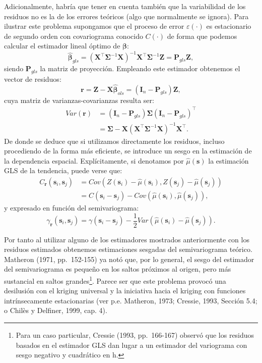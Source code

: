 \documentclass[
  spanish,
]{book}
\theoremstyle{break}
\theoremstyle{definition}
\theoremstyle{definition}
\theoremstyle{definition}
\theoremstyle{definition}
\theoremstyle{remark}
\begin{document}
Adicionalmente, habría que tener en cuenta también que la variabilidad de los residuos no es la de los errores teóricos (algo que normalmente se ignora).
Para ilustrar este problema supongamos que el proceso de error \(\varepsilon(\cdot)\) es estacionario de segundo orden con covariograma conocido \(C(\cdot)\) de forma que podemos calcular el estimador lineal óptimo de \(\boldsymbol{\beta}\):
\[\hat{\boldsymbol{\beta}}_{gls} =(\mathbf{X}^{\top}\boldsymbol{\Sigma}^{-1} \mathbf{X})^{-1} \mathbf{X}^{\top}\boldsymbol{\Sigma}^{-1} \mathbf{Z} = \mathbf{P}_{gls}\mathbf{Z},\]
siendo \(\mathbf{P}_{gls}\) la matriz de proyección.
Empleando este estimador obtenemos el vector de residuos:
\[\mathbf{r} =\mathbf{Z}-\mathbf{X}\hat{\boldsymbol{\beta}}_{ols} =\left( \mathbf{I}_{n} - \mathbf{P}_{gls} \right)\mathbf{Z},\]
cuya matriz de varianzas-covarianzas resulta ser:
\[\begin{aligned}
Var(\mathbf{r}) &=(\mathbf{I}_{n} -\mathbf{P}_{gls})\boldsymbol{\Sigma}(\mathbf{I}_{n}
-\mathbf{P}_{gls})^\top  \\
& = \boldsymbol{\Sigma} - \mathbf{X}(\mathbf{X}^\top\boldsymbol{\Sigma}^{-1} \mathbf{X})^{-1}
\mathbf{X}^\top.
\end{aligned}\]
De donde se deduce que si utilizamos directamente los residuos, incluso procediendo de la forma más eficiente, se introduce un sesgo en la estimación de la dependencia espacial.
Explícitamente, si denotamos por \(\hat{\mu}(\mathbf{s})\) la estimación GLS de la tendencia, puede verse que:
\[\begin{aligned}
C_{\mathbf{r}}(\mathbf{s}_{i} ,\mathbf{s}_{j}) &= Cov\left(Z(\mathbf{s}_{i})-\hat{\mu}(\mathbf{s}_{i}), Z(\mathbf{s}_{j} ) - \hat{\mu}(\mathbf{s}_{j})\right) \\
&= C(\mathbf{s}_{i} -\mathbf{s}_{j}) - Cov(\hat{\mu}(\mathbf{s}_{i} ), \hat{\mu}(\mathbf{s}_{j})),
\end{aligned}\]
y expresado en función del semivariograma:
\[\gamma_{\mathbf{r}}(\mathbf{s}_{i} ,\mathbf{s}_{j}) = \gamma
(\mathbf{s}_{i} -\mathbf{s}_{j})-\frac{1}{2} Var(\hat{\mu}
(\mathbf{s}_{i})-\hat{\mu}(\mathbf{s}_{j})).\]

Por tanto al utilizar alguno de los estimadores mostrados anteriormente con los residuos estimados obtenemos estimaciones sesgadas del semivariograma teórico.
Matheron (1971, pp.~152-155) ya notó que, por lo general, el sesgo del estimador del semivariograma es pequeño en los saltos próximos al origen, pero más sustancial en saltos grandes\footnote{Para un caso particular, Cressie (1993, pp.~166-167) observó que los residuos basados en el estimador GLS dan lugar a un estimador del variograma con sesgo negativo y cuadrático en h.}.
Parece ser que este problema provocó una desilusión con el kriging universal y la iniciativa hacia el kriging con funciones intrínsecamente estacionarias (ver p.e. Matheron, 1973; Cressie, 1993, Sección 5.4; o Chilès y Delfiner, 1999, cap. 4).
\end{document}
